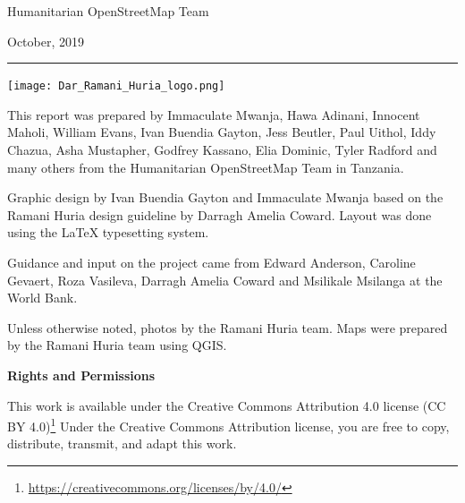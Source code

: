 \documentclass[a4paper,12pt,twoside]{article}
\begin{document}
\begin{center}
  Humanitarian OpenStreetMap Team
  \
  
  October, 2019
\end{center}
\medskip
\begin{center}
\color{RHblue}\rule{\textwidth}{0.5cm}
\end{center}

\newpage
\color{RHgrey}

\begin{center}
{\texttt{[image: Dar\_Ramani\_Huria\_logo.png]}}
\end{center}

This report was prepared by Immaculate Mwanja, Hawa Adinani, Innocent Maholi, William Evans, Ivan Buendia Gayton, Jess Beutler, Paul Uithol, Iddy Chazua, Asha Mustapher, Godfrey Kassano, Elia Dominic, Tyler Radford and many others from the Humanitarian OpenStreetMap Team in Tanzania.

Graphic design by Ivan Buendia Gayton and Immaculate Mwanja based on the Ramani Huria design guideline by Darragh Amelia Coward. Layout was done using the \LaTeX{} typesetting system.

Guidance and input on the project came from Edward Anderson, Caroline Gevaert, Roza Vasileva, Darragh Amelia Coward and Msilikale Msilanga at the World Bank.

Unless otherwise noted, photos by the Ramani Huria team. Maps were prepared by the Ramani Huria team using QGIS.


\begin{flushleft}
	\textbf{Rights and Permissions}
\end{flushleft}

This work is available under the Creative Commons Attribution 4.0  license (CC BY 4.0)\footnote{\url{https://creativecommons.org/licenses/by/4.0/}}  Under the Creative Commons Attribution license, you are free to copy, distribute, transmit, and adapt this work. 


\bigskip\bigskip\bigskip
\end{document}
